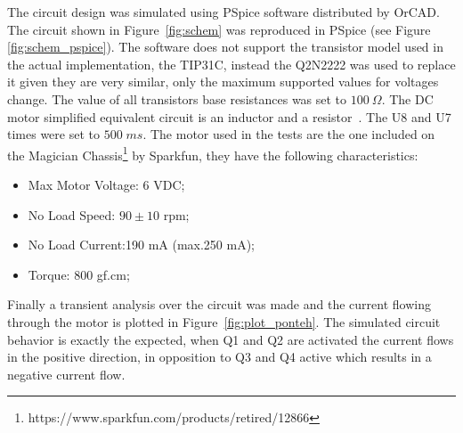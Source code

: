     The circuit design was simulated using PSpice software distributed by OrCAD. The circuit shown in Figure~\ref{fig:schem} was reproduced in PSpice (see Figure \ref{fig:schem_pspice}). The software does not support the transistor model used in the actual implementation, the TIP31C, instead the Q2N2222 was used to replace it given they are very similar, only the maximum supported values for voltages change. The value of all transistors base resistances was set to $100\:\Omega$. The DC motor simplified equivalent circuit is an inductor and a resistor~\cite{CHAPMAN}. The U8 and U7 times were set to $500\; ms$.\newline
    The motor used in the tests are the one included on the Magician Chassis\footnote{https://www.sparkfun.com/products/retired/12866} by Sparkfun, they have the following characteristics:
    \begin{itemize}
        \item Max Motor Voltage: 6 VDC;
        \item No Load Speed: $90\pm10$ rpm;
        \item No Load Current:190 mA (max.250 mA);
        \item Torque: 800 gf.cm;
    \end{itemize}
	Finally a transient analysis over the circuit was made and the current flowing through the motor is plotted in Figure~\ref{fig:plot_ponteh}. The simulated circuit behavior is exactly the expected, when Q1 and Q2 are activated the current flows in the positive direction, in opposition to Q3 and Q4 active which results in a negative current flow.
	


